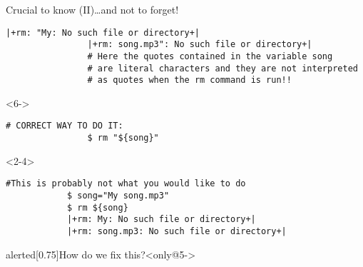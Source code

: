 \begin{frame}[fragile]{Crucial to know (II)}{\ldots{}and not to forget!}
\begin{overlayarea}{\textwidth}{0.5\textheight}
\begin{onlyenv}
\begin{lstlisting}[style=MyBash]
                |+rm: "My: No such file or directory+|
                |+rm: song.mp3": No such file or directory+|
                # Here the quotes contained in the variable song
                # are literal characters and they are not interpreted
                # as quotes when the rm command is run!!
            \end{lstlisting}
        \end{onlyenv}
        \begin{onlyenv}<6->
            \begin{lstlisting}[style=MyBash, firstnumber=9]
                # CORRECT WAY TO DO IT:
                $ rm "${song}"
            \end{lstlisting}
        \end{onlyenv}
    \end{overlayarea}
    \begin{onlyenv}<2-4>
        \begin{lstlisting}[style=MyBash]
            #This is probably not what you would like to do
            $ song="My song.mp3"
            $ rm ${song}
            |+rm: My: No such file or directory+|
            |+rm: song.mp3: No such file or directory+|
        \end{lstlisting}
    \end{onlyenv}
    \medskip
    \begin{varblock}{alerted}[0.75\textwidth]{How do we fix this?}<only@5->
    \end{varblock}
\end{frame}
